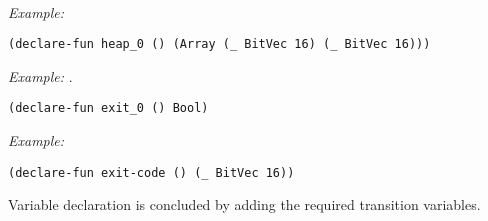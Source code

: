 ~\\
\noindent
\emph{Example:} 

\begin{lstlisting}[style=smtlib]
(declare-fun heap_0 () (Array (_ BitVec 16) (_ BitVec 16)))
\end{lstlisting}

\noindent
\emph{Example:} .

\begin{lstlisting}[style=smtlib]
(declare-fun exit_0 () Bool)
\end{lstlisting}

\noindent
\emph{Example:} 

\begin{lstlisting}[style=smtlib]
(declare-fun exit-code () (_ BitVec 16))
\end{lstlisting}


%
%
%

%


\noindent
Variable declaration is concluded by adding the required transition variables.

